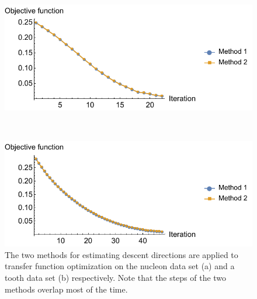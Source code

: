 \begin{figure}
	\centering
	\begin{minipage}{.49\textwidth}
		\includegraphics[width=1\linewidth]{figures/nucleon_naive_proportional_rms_fixed_newton}
		\subcaption{}
	\end{minipage}~
	\begin{minipage}{.49\textwidth}
		\includegraphics[width=1\linewidth]{figures/tooth_naive_rms_fixed_newton}
		\subcaption{}	
	\end{minipage}
	\caption[The two methods for estimating descent directions]
	{The two methods for estimating descent directions are applied to transfer function optimization on the nucleon data set (a) and a tooth data set (b) respectively. Note that the steps of the two methods overlap most of the time.
		}
	\label{fig:nucleon_naive_tooth_naive_rms}
\end{figure}

